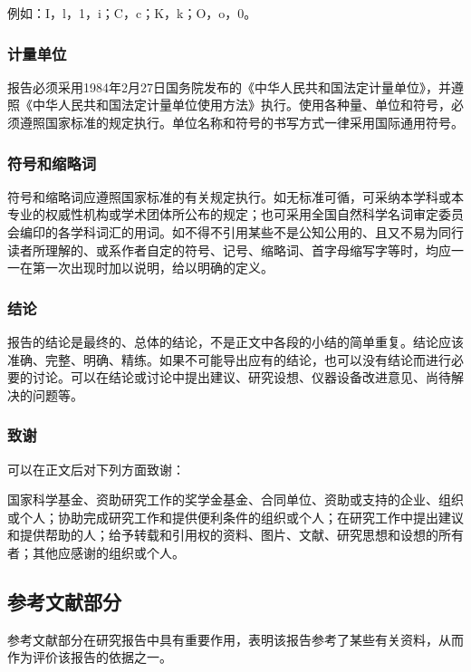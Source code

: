 例如：I，l，1，i；C，c；K，k；O，o，0。

\subsubsection{计量单位}

报告必须采用1984年2月27日国务院发布的《中华人民共和国法定计量单位》，并遵照《中华人民共和国法定计量单位使用方法》执行。使用各种量、单位和符号，必须遵照国家标准的规定执行。单位名称和符号的书写方式一律采用国际通用符号。

\subsubsection{符号和缩略词}

符号和缩略词应遵照国家标准的有关规定执行。如无标准可循，可采纳本学科或本专业的权威性机构或学术团体所公布的规定；也可采用全国自然科学名词审定委员会编印的各学科词汇的用词。如不得不引用某些不是公知公用的、且又不易为同行读者所理解的、或系作者自定的符号、记号、缩略词、首字母缩写字等时，均应一一在第一次出现时加以说明，给以明确的定义。

\subsubsection{结论}

报告的结论是最终的、总体的结论，不是正文中各段的小结的简单重复。结论应该准确、完整、明确、精练。如果不可能导出应有的结论，也可以没有结论而进行必要的讨论。可以在结论或讨论中提出建议、研究设想、仪器设备改进意见、尚待解决的问题等。

\subsubsection{致谢}

可以在正文后对下列方面致谢：

国家科学基金、资助研究工作的奖学金基金、合同单位、资助或支持的企业、组织或个人；协助完成研究工作和提供便利条件的组织或个人；在研究工作中提出建议和提供帮助的人；给予转载和引用权的资料、图片、文献、研究思想和设想的所有者；其他应感谢的组织或个人。

\subsection{参考文献部分}

参考文献部分在研究报告中具有重要作用，表明该报告参考了某些有关资料，从而作为评价该报告的依据之一。

